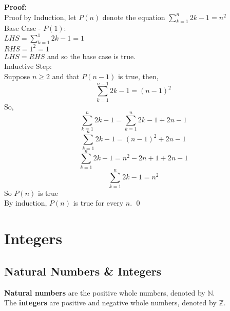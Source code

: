 \documentclass{report}
\newenvironment{frameblack}[1][Black]
  {\begin{tcolorbox}[colframe=#1,colback=white]}
  {\end{tcolorbox}}
\begin{document}
\begin{frameblack}
    \textbf{Proof:}\\
    Proof by Induction, let $P(n)$ denote the equation $\sum_{k=1}^n 2k-1 = n^2$\\
    Base Case - $P(1)$:\\
    $LHS = \sum_{k=1}^1 2k-1 = 1$\\
    $RHS = 1^2 = 1$\\
    $LHS = RHS$ and so the base case is true.\\

    Inductive Step:\\
    Suppose $n \geq 2$ and that $P(n-1)$ is true, then,\\
    \begin{equation*}
        \sum_{k=1}^{n-1} 2k-1 = (n-1)^2
    \end{equation*}
    So,
    \begin{equation*}
        \sum_{k=1}^n 2k-1 = \sum_{k=1}^n 2k-1 + 2n -1
    \end{equation*}
    \begin{equation*}
        \sum_{k=1}^n 2k-1 = (n-1)^2 +2n-1
    \end{equation*}
    \begin{equation*}
        \sum_{k=1}^n 2k-1 = n^2 -2n + 1 + 2n - 1
    \end{equation*}
    \begin{equation*}
        \sum_{k=1}^n 2k-1 = n^2
    \end{equation*}
    So $P(n)$ is true\\
    By induction, $P(n)$ is true for every $n$.
    \qed
\end{frameblack}

\chapter{Integers}
\section{Natural Numbers \& Integers}

\textbf{Natural numbers} are the positive whole numbers, denoted by $\mathbb{N}$.\\
The \textbf{integers} are positive and negative whole numbers, denoted by $\mathbb{Z}$.
\end{document}

